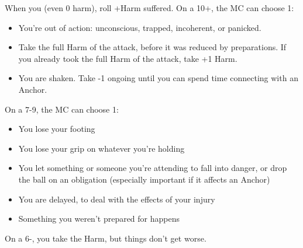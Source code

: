 \begin{multicols}{3}
  \begin{move}
    When you  (even 0 harm), roll +Harm
    suffered. On a 10+, the MC can choose 1:
    \begin{itemize}
      \setlength\itemsep{0em}
    \item You're out of action: unconscious, trapped, incoherent, or
      panicked.
    \item Take the full Harm of the attack, before it was reduced by
      preparations. If you already took the full Harm of the attack, take
      +1 Harm.
    \item You are shaken. Take -1 ongoing until you can spend time
      connecting with an Anchor.
    \end{itemize}
    On a 7-9, the MC can choose 1:
    \begin{itemize}
      \setlength\itemsep{0em}
    \item You lose your footing
    \item You lose your grip on whatever you're holding
    \item You let something or someone you're attending to fall into
      danger, or drop the ball on an obligation (especially important
      if it affects an Anchor)
    \item You are delayed, to deal with the effects of your injury
    \item Something you weren't prepared for happens
    \end{itemize}
    On a 6-, you take the Harm, but things don't get worse.
  \end{move}

  \columnbreak
  

\end{multicols}
